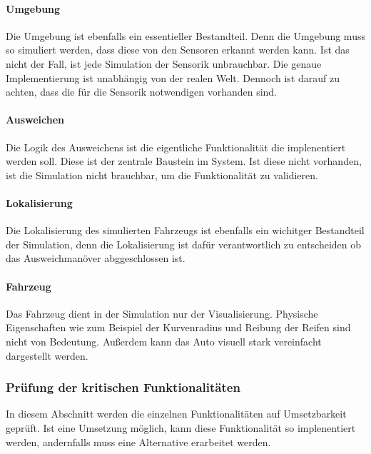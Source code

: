 \paragraph{Umgebung}
Die Umgebung ist ebenfalls ein essentieller Bestandteil. Denn die Umgebung muss so simuliert werden, dass diese von den Sensoren erkannt werden kann. Ist das nicht der Fall, ist jede Simulation der Sensorik unbrauchbar.
Die genaue Implementierung ist unabhängig von der realen Welt. Dennoch ist darauf zu achten, dass die für die Sensorik notwendigen vorhanden sind.

\paragraph{Ausweichen}
Die Logik des Ausweichens ist die eigentliche Funktionalität die implenentiert werden soll. Diese ist der zentrale Baustein im System. 
Ist diese nicht vorhanden, ist die Simulation nicht brauchbar, um die Funktionalität zu validieren.

\paragraph{Lokalisierung}
Die Lokalisierung des simulierten Fahrzeugs ist ebenfalls ein wichitger Bestandteil der Simulation, denn die Lokalisierung ist dafür verantwortlich zu entscheiden ob das Ausweichmanöver abggeschlossen ist.

\paragraph{Fahrzeug}
Das Fahrzeug dient in der Simulation nur der Visualisierung. Physische Eigenschaften wie zum Beispiel der Kurvenradius und Reibung der Reifen sind nicht von Bedeutung. Außerdem kann das Auto visuell stark vereinfacht dargestellt werden. 


\subsubsection{Prüfung der kritischen Funktionalitäten}
\label{pr}

In diesem Abschnitt werden die einzelnen Funktionalitäten auf Umsetzbarkeit geprüft. Ist eine Umsetzung möglich, kann diese Funktionalität so implenentiert werden, andernfalls muss eine Alternative erarbeitet werden.

